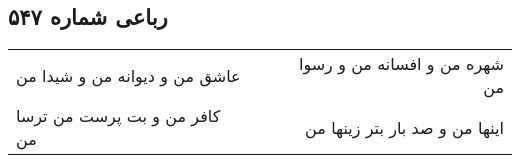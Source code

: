 \begin{center}
\section*{رباعی شماره ۵۴۷}
\label{sec:sh547}
\begin{longtable}{l p{0.5cm} r}
عاشق من و دیوانه من و شیدا من
&&
شهره من و افسانه من و رسوا من
\\
کافر من و بت پرست من ترسا من
&&
اینها من و صد بار بتر زینها من
\\
\end{longtable}
\end{center}
